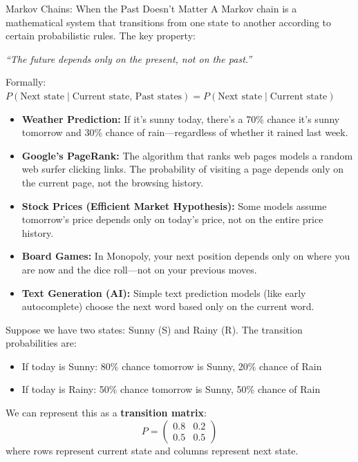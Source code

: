 \begin{itemize}
\begin{funfactsbreak}{Markov Chains: When the Past Doesn't Matter}
A Markov chain is a mathematical system that transitions from one state to another according to certain probabilistic rules. The key property:
\begin{center}
\textit{``The future depends only on the present, not on the past.''}
\end{center}

Formally: $P(\text{Next state} \mid \text{Current state, Past states}) = P(\text{Next state} \mid \text{Current state})$


\begin{itemize}
    \item \textbf{Weather Prediction:} If it's sunny today, there's a 70\% chance it's sunny tomorrow and 30\% chance of rain—regardless of whether it rained last week.

    \item \textbf{Google's PageRank:} The algorithm that ranks web pages models a random web surfer clicking links. The probability of visiting a page depends only on the current page, not the browsing history.

    \item \textbf{Stock Prices (Efficient Market Hypothesis):} Some models assume tomorrow's price depends only on today's price, not on the entire price history.

    \item \textbf{Board Games:} In Monopoly, your next position depends only on where you are now and the dice roll—not on your previous moves.

    \item \textbf{Text Generation (AI):} Simple text prediction models (like early autocomplete) choose the next word based only on the current word.
\end{itemize}


Suppose we have two states: Sunny (S) and Rainy (R). The transition probabilities are:
\begin{itemize}
    \item If today is Sunny: 80\% chance tomorrow is Sunny, 20\% chance of Rain
    \item If today is Rainy: 50\% chance tomorrow is Sunny, 50\% chance of Rain
\end{itemize}

We can represent this as a \textbf{transition matrix}:
\[
P = \begin{pmatrix}
0.8 & 0.2 \\
0.5 & 0.5
\end{pmatrix}
\]
where rows represent current state and columns represent next state.


\end{funfactsbreak}
\end{itemize}
